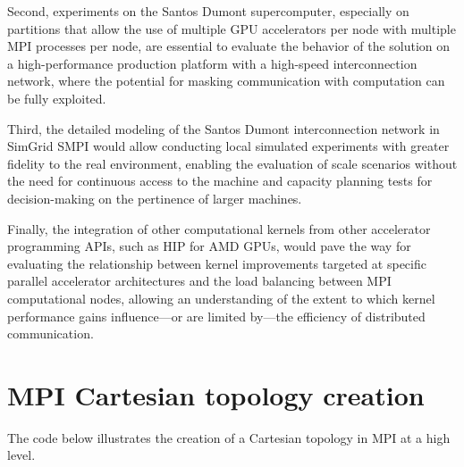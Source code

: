\documentclass[cic,tc,english]{infufrgs}
\begin{document}
Second, experiments on the Santos Dumont supercomputer, especially on
partitions that allow the use of multiple GPU accelerators per node
with multiple MPI processes per node, are essential to evaluate the
behavior of the solution on a high-performance production platform with
a high-speed interconnection network, where the potential for masking
communication with computation can be fully exploited.

Third, the detailed modeling of the Santos Dumont interconnection
network in SimGrid SMPI would allow conducting local simulated
experiments with greater fidelity to the real environment, enabling the
evaluation of scale scenarios without the need for continuous access to
the machine and capacity planning tests for decision-making on the
pertinence of larger machines.

Finally, the integration of other computational kernels from other
accelerator programming APIs, such as HIP for AMD GPUs, would pave the
way for evaluating the relationship between kernel improvements
targeted at specific parallel accelerator architectures and the load
balancing between MPI computational nodes, allowing an understanding of
the extent to which kernel performance gains influence---or are limited
by---the efficiency of distributed communication.



\printglossary
\appendix
\chapter{MPI Cartesian topology creation}
\label{ap:mpi_cart_create}
The code below illustrates the creation of a Cartesian topology in MPI
at a high level.
\end{document}
